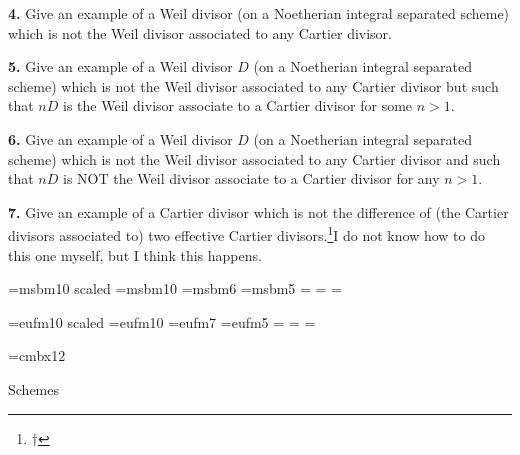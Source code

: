 \medskip\item{\bf 4.} Give an example of a Weil divisor
(on a Noetherian integral separated scheme) which is not
the Weil divisor associated to any Cartier divisor.

\medskip\item{\bf 5.} Give an example of a Weil divisor $D$
(on a Noetherian integral separated scheme) which is not
the Weil divisor associated to any Cartier divisor but
such that $nD$ is the Weil divisor associate to a Cartier
divisor for some $n>1$.

\medskip\item{\bf 6.} Give an example of a Weil divisor $D$
(on a Noetherian integral separated scheme) which is not
the Weil divisor associated to any Cartier divisor and
such that $nD$ is NOT the Weil divisor associate to a Cartier
divisor for any $n>1$.

\medskip\item{\bf 7.}
Give an example of a Cartier divisor
which is not the difference of (the Cartier divisors associated
to) two effective Cartier divisors.\footnote{$\dagger$}{I do not know how to do this one myself, but I think this happens.}

\bye
\nopagenumbers

\font\gbbb=msbm10 scaled 
\font\bbbf=msbm10 
\font\sbbb=msbm6 
\font\ssbbb=msbm5 
=\bbbf
{}=\sbbb 
{}=\ssbbb 
\def\bbb{\fam6}
\def\mP{{\bbb P}} 
\def\mA{{\bbb A}} 
\def\mB{{\bbb B}} 
\def\mR{{\bbb R}}
\def\mZ{{\bbb Z}}

\font\ggothic=eufm10 scaled 
\font\gothicf=eufm10
\font\sgothic=eufm7
\font\ssgothic=eufm5
=\gothicf
{}=\sgothic
{}=\ssgothic
\def\gothic{\fam5}


\font\Kopfont=cmbx12
\def\mapright#1{\smash{\mathop{\longrightarrow}\limits^{#1}}}
\def\mapdown#1{\Big\downarrow\rlap{$\vcenter{\hbox{$\scriptstyle#1$}}$}}
\def\downmap#1{\downarrow\rlap{$\vcenter{\hbox{$\scriptstyle#1$}}$}}
\def\mapup#1{\Big\uparrow\rlap{$\vcenter{\hbox{$\scriptstyle#1$}}$}}
\def\longlongrightarrow{\relbar \joinrel \longrightarrow}
\def\cC{{\cal C}}
\def\cD{{\cal D}}
\def\gp{{\gothic p}}
\def\gq{{\gothic q}}
\def\Spec{\mathop{\rm Spec}}
\def\Proj{\mathop{\rm Proj}}
\def\length{\mathop{\rm length}\nolimits}

\centerline{\Kopfont Schemes}

